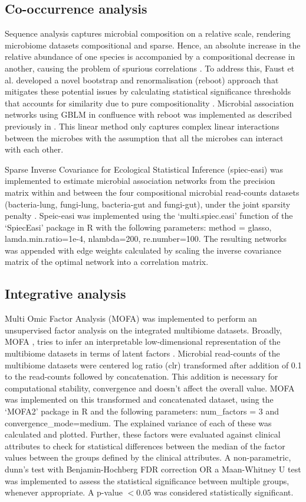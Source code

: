 \subsection{Co-occurrence analysis}
Sequence analysis captures microbial composition on a relative scale, rendering microbiome datasets compositional and sparse. Hence, an absolute increase in the relative abundance of one species is accompanied by a compositional decrease in another, causing the problem of spurious correlations \cite{Aitchison1982}. To address this, Faust et al. developed a novel bootstrap and renormalisation (reboot) approach that mitigates these potential issues by calculating statistical significance thresholds that accounts for similarity due to pure compositionality \cite{Faust2012}. Microbial association networks using GBLM in confluence with reboot was implemented as described previously in \cite{Narayana2019}. This linear method only captures complex linear interactions between the microbes with the assumption that all the microbes can interact with each other. 
 
Sparse Inverse Covariance for Ecological Statistical Inference (spiec-easi) was implemented to estimate microbial association networks from the precision matrix within and between the four compositional microbial read-counts datasets (bacteria-lung, fungi-lung, bacteria-gut and fungi-gut), under the joint sparsity penalty \cite{Kurtz2015}. Speic-easi was implemented using the `multi.spiec.easi' function of the `SpiecEasi' package in R with the following parameters: method = glasso, lamda.min.ratio=1e-4, nlambda=200, re.number=100. The resulting networks was appended with edge weights calculated by scaling the inverse covariance matrix of the optimal network into a correlation matrix.


\subsection{Integrative analysis}
Multi Omic Factor Analysis (MOFA) was implemented to perform an unsupervised factor analysis on the integrated multibiome datasets. Broadly, MOFA , tries to infer an interpretable low-dimensional representation of the multibiome datasets in terms of latent factors \cite{Argelaguet2020}. Microbial read-counts of the multibiome datasets were centered log ratio (clr) transformed after addition of 0.1 to the read-counts followed by concatenation. This addition is necessary for computational stability, convergence and doesn't affect the overall value. MOFA was implemented on this transformed and concatenated dataset, using the `MOFA2' package in R and the following parameters: num\_factors = 3 and convergence\_mode=medium. The explained variance of each of these was calculated and plotted. Further, these factors were evaluated against clinical attributes to check for statistical differences between the median of the factor values between the groups defined by the clinical attributes. A non-parametric, dunn's test with Benjamin-Hochberg FDR correction OR a Maan-Whitney U test was implemented to assess the statistical significance between multiple groups, whenever appropriate. A p-value $< 0.05$ was considered statistically significant.


